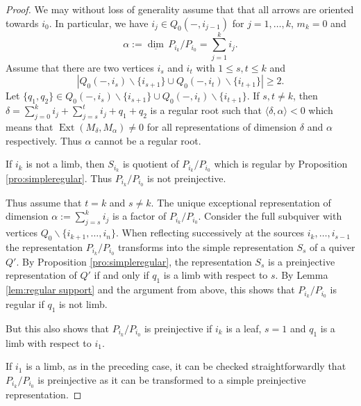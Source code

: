 \documentclass{amsart}
\newcommand{\sayT}[1]{\say[T]{#1}}
\numberwithin{equation}{section}
\newcommand\udim{{\underline{\dim}\, }}
\newcommand{\Ext}{\operatorname{Ext}}
\newcommand{\Hom}{\operatorname{Hom}}
\newcommand{\Sc}[2]{\langle #1,#2\rangle}
\begin{document}
\begin{proof}
We may without loss of generality assume that that all arrows are oriented towards $i_0$. In particular, we have $i_j\in Q_0(-,i_{j-1})$ for $j=1,\ldots,k$, $m_k=0$ and
$$\alpha:=\udim P_{i_k}/P_{i_0}=\sum_{j=1}^{k}i_j.$$
Assume that there are two vertices $i_s$ and $i_t$ with $1\leq s,t\leq k$ and $$|Q_0(-,i_s)\backslash\{i_{s+1}\}\cup Q_0(-,i_t)\backslash\{i_{t+1}\}|\geq 2.$$
Let $\{q_1,q_2\}\in Q_0(-,i_s)\backslash\{i_{s+1}\}\cup Q_0(-,i_t)\backslash\{i_{t+1}\}$.
If $s,t\neq k$, then  $\delta=\sum_{j=0}^ki_j+\sum_{j=s}^ti_j+q_1+q_2$ is a regular root such that $\Sc{\delta}{\alpha}<0$ which means that $\Ext(M_\delta,M_\alpha)\neq 0$ for all representations of dimension $\delta$ and $\alpha$ respectively. Thus $\alpha$ cannot be a regular root.


If $i_k$ is not a limb, then $S_{i_k}$ is quotient of $P_{i_k}/P_{i_0}$ which is regular by Proposition \ref{pro:simpleregular}. Thus $P_{i_k}/P_{i_0}$ is not preinjective.

Thus assume that $t=k$ and $s\neq k$. The unique exceptional representation of dimension 
$\alpha:=\sum_{j=s}^ki_j$ is a factor of $P_{i_k}/P_{i_0}$. Consider the full subquiver with vertices $Q_0\backslash\{i_{k+1},\ldots,i_n\}$. When reflecting successively at the sources $i_k,\ldots,i_{s-1}$ the representation $P_{i_k}/P_{i_0}$ transforms into the simple representation $S_s$ of a quiver $Q'$. By Proposition \ref{pro:simpleregular}, the representation $S_s$ is a preinjective representation of $Q'$ if and only if $q_1$ is a limb with respect to $s$. By Lemma \ref{lem:regular support} and the argument from above, this shows that $P_{i_k}/P_{i_0}$ is regular if $q_1$ is not limb. 


But this also shows that $P_{i_k}/P_{i_0}$ is preinjective if $i_k$ is a leaf, $s=1$ and $q_1$ is a limb with respect to $i_1$. 


If $i_1$ is a limb, as in the preceding case, it can be checked straightforwardly that $P_{i_k}/P_{i_0}$ is preinjective as it can be transformed to a simple preinjective representation.\sayT{do this direct check}


\end{proof}
\end{document}

